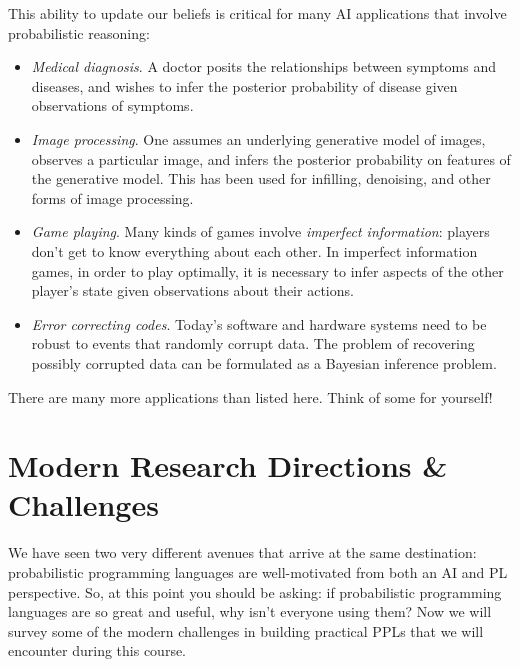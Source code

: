 \documentclass{tufte-handout}
\begin{document}
This ability to update our beliefs is critical for many AI applications 
that involve probabilistic reasoning:
\begin{itemize}
  \item \emph{Medical diagnosis}. A doctor posits the relationships between symptoms and 
  diseases, and wishes to infer the posterior probability of disease given observations 
  of symptoms.
  \item \emph{Image processing}. One assumes an underlying generative model of images, 
  observes a particular image, and infers the posterior probability on features of the 
  generative model. This has been used for infilling, denoising, and other forms of image processing.
  \item \emph{Game playing}. Many kinds of games involve \emph{imperfect information}: players
  don't get to know everything about each other. In imperfect information games, in order to 
  play optimally, it is necessary to infer aspects of the other player's state given observations 
  about their actions.
  \item \emph{Error correcting codes}. Today's software and hardware systems need to be robust to 
  events that randomly corrupt data. The problem of recovering possibly corrupted data can 
  be formulated as a Bayesian inference problem.
\end{itemize}
There are many more applications than listed here. Think of some for yourself!

\section{Modern Research Directions \& Challenges}
We have seen two very different avenues that arrive at the same destination: 
probabilistic programming languages are well-motivated from both an AI and PL 
perspective.  So, at this point you should be asking: if probabilistic
programming languages are so great and useful, why isn't everyone using them? 
Now we will survey some of the modern challenges in building practical PPLs 
that we will encounter during this course.


\end{document}
